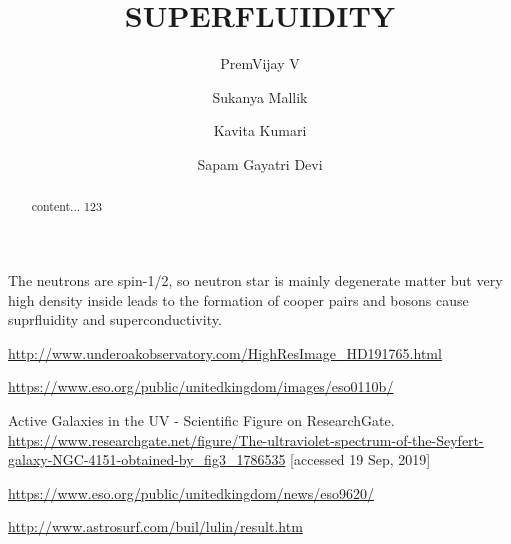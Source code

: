 \documentclass[11pt]{report}
\title{SUPERFLUIDITY}
\author[1]{ PremVijay V}
\author[1]{	Sukanya Mallik}
\author[1]{	Kavita Kumari}
\author[1]{	Sapam Gayatri Devi}
\affil[1]{The Inter-University Centre for Astronomy and Astrophysics}
\begin{document}
\maketitle

\begin{abstract}
	content... 123
\end{abstract}

The neutrons are spin-1/2, so neutron star is mainly degenerate matter but very high density inside leads to the formation of cooper pairs and bosons cause suprfluidity and superconductivity.

\begin{thebibliography}{9}
	
	\url{http://www.underoakobservatory.com/HighResImage_HD191765.html}
	
	\url{https://www.eso.org/public/unitedkingdom/images/eso0110b/}
	
	Active Galaxies in the UV - Scientific Figure on ResearchGate. \url{https://www.researchgate.net/figure/The-ultraviolet-spectrum-of-the-Seyfert-galaxy-NGC-4151-obtained-by_fig3_1786535} [accessed 19 Sep, 2019]
	
	\url{https://www.eso.org/public/unitedkingdom/news/eso9620/}
	
	\url{http://www.astrosurf.com/buil/lulin/result.htm}
	
	
	
	
\end{thebibliography}
\end{document}
